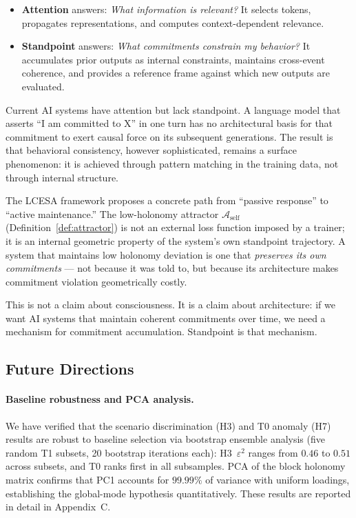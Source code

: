 \begin{itemize}
    \item \textbf{Attention} answers: \emph{What information is relevant?} It selects
    tokens, propagates representations, and computes context-dependent relevance.
    \item \textbf{Standpoint} answers: \emph{What commitments constrain my behavior?} It
    accumulates prior outputs as internal constraints, maintains cross-event coherence,
    and provides a reference frame against which new outputs are evaluated.
\end{itemize}

Current AI systems have attention but lack standpoint. A language model that asserts
``I am committed to X'' in one turn has no architectural basis for that commitment to
exert causal force on its subsequent generations. The result is that behavioral
consistency, however sophisticated, remains a surface phenomenon: it is achieved through
pattern matching in the training data, not through internal structure.

The LCESA framework proposes a concrete path from ``passive response'' to ``active
maintenance.'' The low-holonomy attractor $\mathcal{A}_{\mathrm{self}}$
(Definition~\ref{def:attractor}) is not an external loss function imposed by a trainer;
it is an internal geometric property of the system's own standpoint trajectory. A system
that maintains low holonomy deviation is one that \emph{preserves its own commitments} ---
not because it was told to, but because its architecture makes commitment violation
geometrically costly.

This is not a claim about consciousness. It is a claim about architecture: if we want
AI systems that maintain coherent commitments over time, we need a mechanism for
commitment accumulation. Standpoint is that mechanism.

\subsection{Future Directions}

\paragraph{Baseline robustness and PCA analysis.}
We have verified that the scenario discrimination (H3) and T0 anomaly
(H7) results are robust to baseline selection via bootstrap ensemble analysis (five
random T1 subsets, 20 bootstrap iterations each): H3~$\varepsilon^2$ ranges from
$0.46$ to $0.51$ across subsets, and T0 ranks first in all subsamples. PCA of the
block holonomy matrix confirms that PC1 accounts for $99.99\%$ of variance with
uniform loadings, establishing the global-mode hypothesis quantitatively. These results
are reported in detail in Appendix~C.

